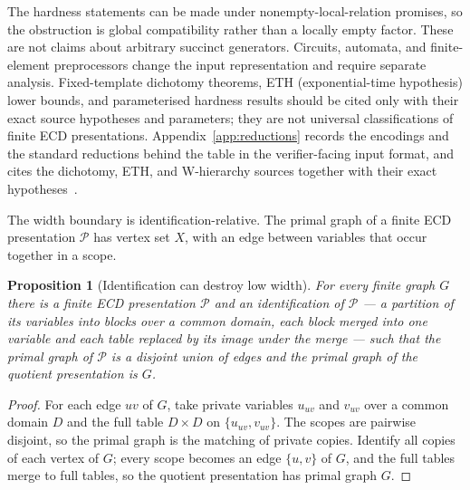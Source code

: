 \documentclass[11pt]{article}
\theoremstyle{plain}
\newtheorem{proposition}[theorem]{Proposition}
\theoremstyle{definition}
\theoremstyle{remark}
\begin{document}
The hardness statements can be made under nonempty-local-relation promises, so
the obstruction is global compatibility rather than a locally empty factor.
These are not claims about arbitrary succinct generators.  Circuits, automata,
and finite-element preprocessors change the input representation and require
separate analysis.  Fixed-template dichotomy theorems, ETH (exponential-time
hypothesis) lower bounds, and parameterised hardness results should be cited only with their exact source
hypotheses and parameters; they are not universal classifications of finite ECD
presentations.  Appendix~\ref{app:reductions} records the encodings and the
standard reductions behind the table in the verifier-facing input format, and
cites the dichotomy, ETH, and W-hierarchy sources together with their exact
hypotheses~\cite{schaefer78,zhuk17,impagliazzo-paturi01,downey-fellows99}.

The width boundary is identification-relative.  The primal graph of a finite
ECD presentation \(\mathcal P\) has vertex set \(X\), with an edge between
variables that occur together in a scope.

\begin{proposition}[Identification can destroy low width]
\label{prop:identification-width}
For every finite graph \(G\) there is a finite ECD presentation \(\mathcal P\)
and an identification of \(\mathcal P\) --- a partition of its variables into
blocks over a common domain, each block merged into one variable and each
table replaced by its image under the merge --- such that the primal graph of
\(\mathcal P\) is a disjoint union of edges and the primal graph of the
quotient presentation is \(G\).
\end{proposition}

\begin{proof}
For each edge \(uv\) of \(G\), take private variables \(u_{uv}\) and
\(v_{uv}\) over a common domain \(D\) and the full table \(D\times D\) on
\(\{u_{uv},v_{uv}\}\).  The scopes are pairwise disjoint, so the primal
graph is the matching of private copies.  Identify all copies of each vertex
of \(G\); every scope becomes an edge \(\{u,v\}\) of \(G\), and the full
tables merge to full tables, so the quotient presentation has primal graph
\(G\).
\end{proof}
\end{document}
